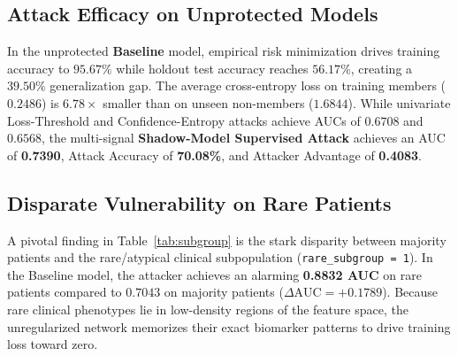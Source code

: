 \documentclass[10pt,twocolumn]{article}
\begin{document}
\subsection{Attack Efficacy on Unprotected Models}
In the unprotected \textbf{Baseline} model, empirical risk minimization drives training accuracy to $95.67\%$ while holdout test accuracy reaches $56.17\%$, creating a $39.50\%$ generalization gap. The average cross-entropy loss on training members ($0.2486$) is $6.78\times$ smaller than on unseen non-members ($1.6844$). While univariate Loss-Threshold and Confidence-Entropy attacks achieve AUCs of $0.6708$ and $0.6568$, the multi-signal \textbf{Shadow-Model Supervised Attack} achieves an AUC of \textbf{0.7390}, Attack Accuracy of \textbf{70.08\%}, and Attacker Advantage of \textbf{0.4083}.

\subsection{Disparate Vulnerability on Rare Patients}
A pivotal finding in Table~\ref{tab:subgroup} is the stark disparity between majority patients and the rare/atypical clinical subpopulation (\texttt{rare\_subgroup = 1}). In the Baseline model, the attacker achieves an alarming \textbf{0.8832 AUC} on rare patients compared to $0.7043$ on majority patients ($\Delta\text{AUC} = +0.1789$). Because rare clinical phenotypes lie in low-density regions of the feature space, the unregularized network memorizes their exact biomarker patterns to drive training loss toward zero.
\end{document}
